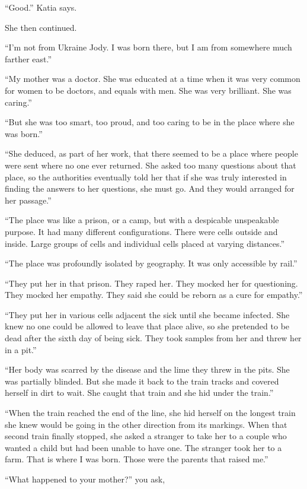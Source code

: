\documentclass[17pt, twoside, a5paper, openright, extrafontsizes]{memoir}
\begin{document}
``Good.'' Katia says.

She then continued.

``I'm not from Ukraine Jody. I was born there, but I am from somewhere
much farther east.''

``My mother was a doctor. She was educated at a time when it was very
common for women to be doctors, and equals with men. She was very
brilliant. She was caring.''

``But she was too smart, too proud, and too caring to be in the place
where she was born.''

``She deduced, as part of her work, that there seemed to be a place
where people were sent where no one ever returned. She asked too many
questions about that place, so the authorities eventually told her that
if she was truly interested in finding the answers to her questions, she
must go. And they would arranged for her passage.''

``The place was like a prison, or a camp, but with a despicable
unspeakable purpose. It had many different configurations. There were
cells outside and inside. Large groups of cells and individual cells
placed at varying distances.''

``The place was profoundly isolated by geography. It was only accessible
by rail.''

``They put her in that prison. They raped her. They mocked her for
questioning. They mocked her empathy. They said she could be reborn as a
cure for empathy.''

``They put her in various cells adjacent the sick until she became
infected. She knew no one could be allowed to leave that place alive, so
she pretended to be dead after the sixth day of being sick. They took
samples from her and threw her in a pit.''

``Her body was scarred by the disease and the lime they threw in the
pits. She was partially blinded. But she made it back to the train
tracks and covered herself in dirt to wait. She caught that train and
she hid under the train.''

``When the train reached the end of the line, she hid herself on the
longest train she knew would be going in the other direction from its
markings. When that second train finally stopped, she asked a stranger
to take her to a couple who wanted a child but had been unable to have
one. The stranger took her to a farm. That is where I was born. Those
were the parents that raised me.''

``What happened to your mother?'' you ask,
\end{document}
